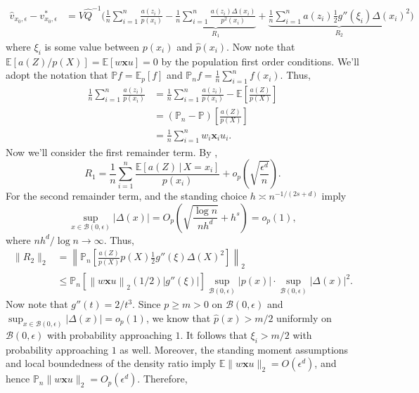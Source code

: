 \documentclass[11pt]{article}
\begin{document}
\begin{appendices}
\begin{align}
    \hat{v}_{x_0, \epsilon} - v^*_{x_0, \epsilon} &= V\hat{Q}^{-1}\bigg(\frac{1}{n}\sum_{i = 1}^n\frac{a(z_i)}{p(x_i)} - \underbrace{\frac{1}{n}\sum_{i = 1}^n\frac{a(z_i)\Delta(x_i)}{p^2(x_i)}}_{R_1} + \underbrace{\frac{1}{n}\sum_{i = 1}^na(z_i) \frac{1}{2}g''(\xi_i)\Delta(x_i)^2}_{R_2}\bigg) \label{eq: expansion with remainder}
\end{align}
where $\xi_i$ is some value between $p(x_i)$ and $\hat{p}(x_i)$. Now note that $\mathbb{E}[a(Z)/p(X)] = \mathbb{E}[w\boldsymbol{x}u] = 0$ by the population first order conditions. We'll adopt the notation that $\mathbb{P}f = \mathbb{E}_{p}[f]$ and $\mathbb{P}_nf = \frac{1}{n}\sum_{i = 1}^nf(x_i)$. Thus,
\begin{align*}
    \frac{1}{n}\sum_{i = 1}^n\frac{a(z_i)}{p(x_i)} &= \frac{1}{n}\sum_{i = 1}^n\frac{a(z_i)}{p(x_i)} - \mathbb{E}\left[\frac{a(Z)}{p(X)}\right] \\
    &= (\mathbb{P}_n -\mathbb{P})\left[\frac{a(Z)}{p(X)}\right] \\
    &= \frac{1}{n}\sum_{i = 1}^n w_i \boldsymbol{x}_i u_i.
\end{align*}
Now we'll consider the first remainder term. By ,
\[
    R_1 = \frac{1}{n}\sum_{i = 1}^n \frac{\mathbb{E}[a(Z)\,|\,X=x_i]}{p(x_i)} + o_p\left(\sqrt{\frac{\epsilon^d}{n}}\right).
\]
For the second remainder term,  and the standing choice $h\asymp n^{-1/(2s+d)}$ imply
\[
    \sup_{x\in \mathcal{B}(0, \epsilon)} \left|\Delta(x)\right| =O_p\left(\sqrt{\frac{\log n}{nh^d}} +h^s \right) =o_p(1),
\]
where $nh^d/\log n\rightarrow\infty$. Thus,
\begin{align*}
    \|R_2\|_2 &= \left\|\mathbb{P}_n\left[\frac{a(Z)}{p(X)}p(X)\frac{1}{2}g''(\xi)\Delta(X)^2\right]\right\|_2\\
    &\leq \mathbb{P}_n[\left\|w\boldsymbol{x}u\right\|_2(1/2)|g''(\xi)|]\sup_{\mathcal{B}(0, \epsilon)}|p(x)|\cdot \sup_{\mathcal{B}(0, \epsilon)}|\Delta(x)|^2.
\end{align*}
Now note that $g''(t) = 2/t^3$. Since $p\geq m>0$ on $\mathcal{B}(0,\epsilon)$ and $\sup_{x\in \mathcal{B}(0,\epsilon)}|\Delta(x)|=o_p(1)$, we know that $\hat{p}(x)>m/2$ uniformly on $\mathcal{B}(0,\epsilon)$ with probability approaching $1$. It follows that $\xi_i>m/2$ with probability approaching $1$ as well. Moreover, the standing moment assumptions and local boundedness of the density ratio imply $\mathbb{E}\|w\boldsymbol{x}u\|_2=O(\epsilon^d)$, and hence $\mathbb{P}_n\|w\boldsymbol{x}u\|_2=O_p(\epsilon^d)$. Therefore,

\end{appendices}
\end{document}

